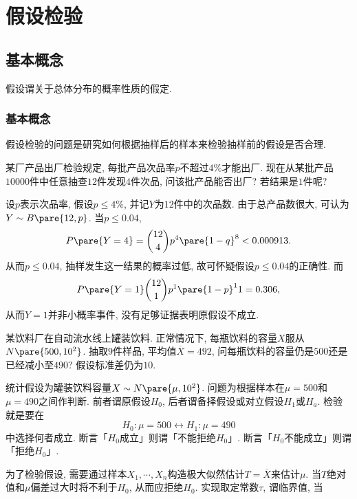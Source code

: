 \documentclass[../Statistics.tex]{subfiles}
\begin{document}
\section{假设检验} %
\label{sec:假设检验}

\subsection{基本概念} %
\label{sub:基本概念}

假设谓关于总体分布的概率性质的假定.

\subsubsection{基本概念} %
\label{ssub:基本概念}

假设检验的问题是研究如何根据抽样后的样本来检验抽样前的假设是否合理.
\begin{sample}
    \begin{ex}
        某厂产品出厂检验规定, 每批产品次品率$p$不超过$4\%$才能出厂. 现在从某批产品$10000$件中任意抽查$12$件发现$4$件次品, 问该批产品能否出厂? 若结果是$1$件呢?
    \end{ex}
    \begin{solution}
        设$p$表示次品率, 假设$p\le 4\%$, 并记$Y$为$12$件中的次品数. 由于总产品数很大, 可认为$Y\sim B\pare{12,p}$. 当$p\le 0.04$,
        \[ P\pare{Y=4} = \binom{12}{4} p^4\pare{1-q}^8 < 0.000913. \]
        从而$p\le 0.04$, 抽样发生这一结果的概率过低, 故可怀疑假设$p\le 0.04$的正确性. 而
        \[ P\pare{Y=1} \binom{12}{1}p^1\pare{1-p}^11 = 0.306, \]
        从而$Y=1$并非小概率事件, 没有足够证据表明原假设不成立.
    \end{solution}
\end{sample}
\begin{sample}
    \begin{ex}
        某饮料厂在自动流水线上罐装饮料. 正常情况下, 每瓶饮料的容量$X$服从$N\pare{500,10^2}$. 抽取$9$件样品, 平均值$\overbar{X} = 492$, 问每瓶饮料的容量仍是$500$还是已经减小至$490$? 假设标准差仍为$10$.
    \end{ex}
\end{sample}
统计假设为罐装饮料容量$X\sim N\pare{\mu,10^2}$. 问题为根据样本在$\mu=500$和$\mu=490$之间作判断. 前者谓原假设$H_0$, 后者谓备择假设或对立假设$H_1$或$H_a$. 检验就是要在
\[ H_0: \mu=500 \leftrightarrow H_1: \mu = 490 \]
中选择何者成立. 断言「$H_0$成立」则谓「不能拒绝$H_0$」. 断言「$H_0$不能成立」则谓「拒绝$H_0$」.
\par
为了检验假设, 需要通过样本$X_1,\cdots,X_n$构造极大似然估计$T=\overbar{X}$来估计$\mu$. 当$T$绝对值和$\mu$偏差过大时将不利于$H_0$, 从而应拒绝$H_0$. 实现取定常数$\tau$, 谓临界值, 当
\end{document}
